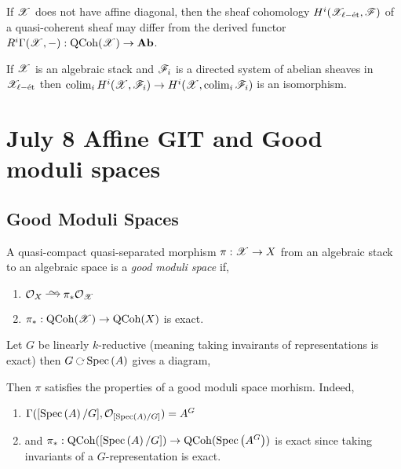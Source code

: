 \documentclass[12pt]{article}
\begin{document}
\begin{rmk}
If $\mathscr{X}$ does not have affine diagonal, then the sheaf cohomology $H^i(\mathscr{X}_{\ell-\text{\'{e}t}}, \mathscr{F})$ of a quasi-coherent sheaf may differ from the derived functor $R^i \Gamma(\mathscr{X}, -) : \mathrm{QCoh}{(\mathscr{X})} \to \mathbf{Ab}$.
\end{rmk}

\begin{prop}
If $\mathscr{X}$ is an algebraic stack and $\mathscr{F}_i$ is a directed system of abelian sheaves in $\mathscr{X}_{\ell-\text{\'{e}t}}$ then $\operatorname*{\mathrm{colim}}_i H^i(\mathscr{X}, \mathscr{F}_i) \to H^i(\mathscr{X}, \operatorname*{\mathrm{colim}}_i \mathscr{F}_i)$ is an isomorphism. 
\end{prop}

\section{July 8 Affine GIT and Good moduli spaces}

\subsection{Good Moduli Spaces}

\begin{defn}
A quasi-compact quasi-separated morphism $\pi : \mathscr{X} \to X$ from an algebraic stack to an algebraic space is a \textit{good moduli space} if,
\begin{enumerate}
\item $\struct{X} \iso \pi_* \struct{\X}$
\item $\pi_* : \mathrm{QCoh}(\mathscr{X}) \to \mathrm{QCoh}(X)$ is exact.
\end{enumerate}
\end{defn}

\begin{example}
Let $G$ be linearly $k$-reductive (meaning taking invairants of representations is exact) then $G \acts \Spec{A}$ gives a diagram,
\begin{center}
\end{center}
Then $\pi$ satisfies the properties of a good moduli space morhism. Indeed,
\begin{enumerate}
\item $\Gamma([\mathrm{Spec}\left( A \right)/G], \mathcal{O}_{[\mathrm{Spec}\left( A \right)/G]}) = A^G$ 

\item and $\pi_* : \mathrm{QCoh}([\mathrm{Spec}\left( A \right)/G]) \to \mathrm{QCoh}(\mathrm{Spec}\left( A^G \right))$ is exact since taking invariants of a $G$-representation is exact.
\end{enumerate}
\end{example}
\end{document}
